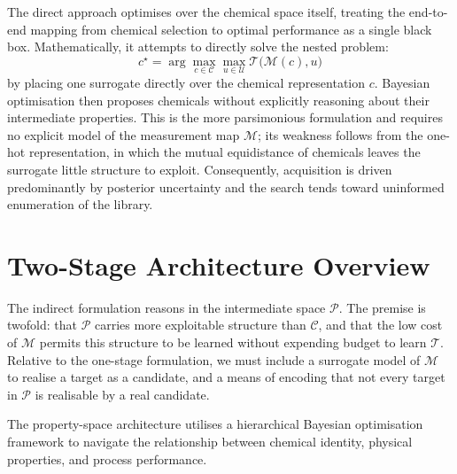 \documentclass[preprint,12pt]{elsarticle}
\begin{document}
The direct approach optimises over the chemical space itself, treating the end-to-end mapping from chemical selection to optimal performance as a single black box. Mathematically, it attempts to directly solve the nested problem:
$$c^{\star} = \arg\max_{c\in\mathcal{C}} \max_{u\in\mathcal{U}} \mathcal{T}\big(\mathcal{M}(c), u\big)$$
by placing one surrogate directly over the chemical representation $c$. Bayesian optimisation then proposes chemicals without explicitly reasoning about their intermediate properties. This is the more parsimonious formulation and requires no explicit model of the measurement map $\mathcal{M}$; its weakness follows from the one-hot representation, in which the mutual equidistance of chemicals leaves the surrogate little structure to exploit. Consequently, acquisition is driven predominantly by posterior uncertainty and the search tends toward uninformed enumeration of the library.

\section{Two-Stage Architecture Overview}

The indirect formulation reasons in the intermediate space $\mathcal{P}$. The premise is twofold: that $\mathcal{P}$ carries more exploitable structure than $\mathcal{C}$, and that the low cost of $\mathcal{M}$ permits this structure to be learned without expending budget to learn $\mathcal{T}$. Relative to the one-stage formulation, we must include a surrogate model of $\mathcal{M}$ to realise a target as a candidate, and a means of encoding that not every target in $\mathcal{P}$ is realisable by a real candidate.

The property-space architecture utilises a hierarchical Bayesian optimisation framework to navigate the relationship between chemical identity, physical properties, and process performance. %
\end{document}
